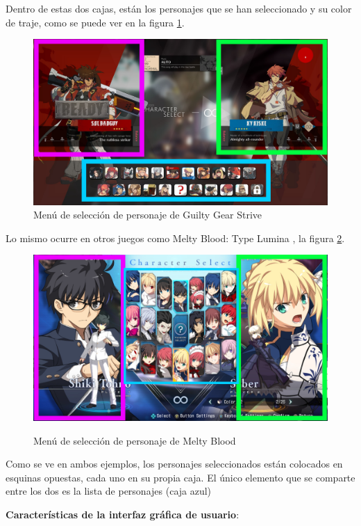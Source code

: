 Dentro de estas dos cajas, están los personajes que se han seleccionado y su color de traje, como se puede ver en la figura \ref{fig: strive chracter select}.

\begin{figure}[ht!]
    \centering
    \includegraphics[height=0.5\textwidth]{figures/guilty.jpg}
    \caption{Menú de selección de personaje de Guilty Gear Strive}
    \label{fig: strive chracter select}
\end{figure}

Lo mismo ocurre en otros juegos como Melty Blood: Type Lumina \cite{noauthor_melty_nodate}, la figura \ref{fig: melty character select}.

\begin{figure}[ht!]
    \centering
    \caption{Menú de selección de personaje de Melty Blood}
    \includegraphics[height=0.5\textwidth]{figures/melty.jpg}
    \label{fig: melty character select}
\end{figure}

Como se ve en ambos ejemplos, los personajes seleccionados están colocados en esquinas opuestas, cada uno en su propia caja. El único elemento que se comparte entre los dos es la lista de personajes (caja azul)

\textbf{Características de la interfaz gráfica de usuario}: 

